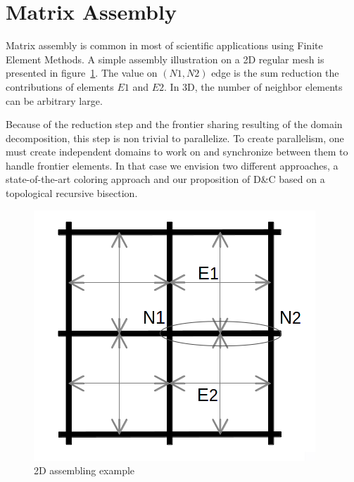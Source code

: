 \documentclass{IOS-Book-Article}
\begin{document}
\section{Matrix Assembly}

Matrix assembly is common in most of scientific applications using Finite Element Methods.
A simple assembly illustration on a 2D regular mesh is presented in figure~\ref{fig:2Dasm}.
The value on $(N1,N2)$ edge is the sum reduction the contributions of elements $E1$ and $E2$.
In 3D, the number of neighbor elements can be arbitrary large.

Because of the reduction step and the frontier sharing resulting of the domain decomposition, this step is non trivial to parallelize.
To create parallelism, one must create independent domains to work on and synchronize between them to handle frontier elements.
In that case we envision two different approaches, a state-of-the-art coloring approach and our proposition of D\&C based on a topological recursive bisection.
\begin{figure}[htp]
 \centering
 \includegraphics[scale=0.2]{2D_asm.png}
 \caption{2D assembling example}
 \label{fig:2Dasm}
\end{figure}
\end{document}
